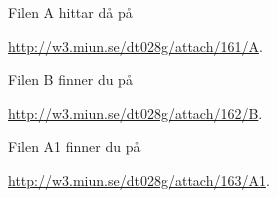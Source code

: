 \documentclass[a4paper]{miunasgn}
\begin{document}
Filen A hittar då på
\begin{center}
	\url{http://w3.miun.se/dt028g/attach/161/A}.
\end{center}

Filen B finner du på
\begin{center}
	\url{http://w3.miun.se/dt028g/attach/162/B}.
\end{center}

Filen A1 finner du på
\begin{center}
	\url{http://w3.miun.se/dt028g/attach/163/A1}.
\end{center}




%
\end{document}
